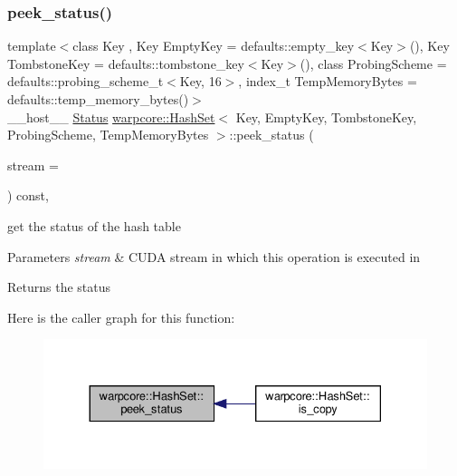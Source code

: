\subsubsection{\texorpdfstring{peek\+\_\+status()}{peek\_status()}}
{\footnotesize\ttfamily template$<$class Key , Key Empty\+Key = defaults\+::empty\+\_\+key$<$\+Key$>$(), Key Tombstone\+Key = defaults\+::tombstone\+\_\+key$<$\+Key$>$(), class Probing\+Scheme  = defaults\+::probing\+\_\+scheme\+\_\+t$<$\+Key, 16$>$, index\+\_\+t Temp\+Memory\+Bytes = defaults\+::temp\+\_\+memory\+\_\+bytes()$>$ \\
\+\_\+\+\_\+host\+\_\+\+\_\+ \hyperlink{classwarpcore_1_1Status}{Status} \hyperlink{classwarpcore_1_1HashSet}{warpcore\+::\+Hash\+Set}$<$ Key, Empty\+Key, Tombstone\+Key, Probing\+Scheme, Temp\+Memory\+Bytes $>$\+::peek\+\_\+status (\begin{DoxyParamCaption}\item[{cuda\+Stream\+\_\+t}]{stream = {} }\end{DoxyParamCaption}) const\hspace{0.3cm}{\ttfamily [inline]}, {\ttfamily [noexcept]}}



get the status of the hash table 


\begin{DoxyParams}{Parameters}
{\em stream} & C\+U\+DA stream in which this operation is executed in \\
\hline
\end{DoxyParams}
\begin{DoxyReturn}{Returns}
the status 
\end{DoxyReturn}
Here is the caller graph for this function\+:
\nopagebreak
\begin{figure}[H]
\begin{center}
\leavevmode
\includegraphics[width=330pt]{classwarpcore_1_1HashSet_a15b81a16c6fbdb88dee1fd8c05a9fdbd_icgraph}
\end{center}
\end{figure}
\mbox{\label{classwarpcore_1_1HashSet_ae9a6c692c64bbc40bb6abd3372b946d1}} 
